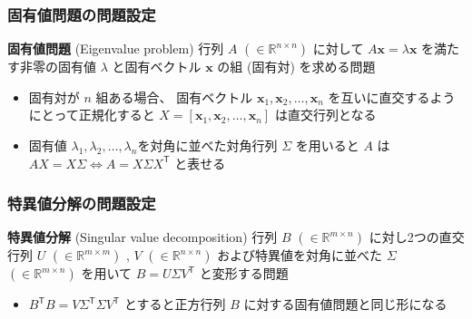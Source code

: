 \documentclass[dvipdfmx,aspectratio=169,20pt]{beamer}
\newcommand{\myfontsetting}[3]{{\fontsize{#1}{#2}\selectfont #3}}
\begin{document}
\begin{frame}
\frametitle{\large 固有値問題の問題設定}

\begin{block}{\myfontsetting{22pt}{22pt}{\bf 固有値問題} {\small (Eigenvalue problem)}}
\myfontsetting{17pt}{17pt}{
    行列 $A$ \myfontsetting{12pt}{12pt}{
    $(\in \mathbb{R}^{n\times n})$
    }
    に対して $A\bm{x} = \lambda \bm{x}$ を満たす非零の固有値 $\lambda$ と固有ベクトル $\bm{x}$ の組 (固有対) を求める問題
}
\end{block}

\vspace{-2mm}

\begin{itemize}
    \item \myfontsetting{15pt}{15pt}{ 
    固有対が $n$ 組ある場合、
    固有ベクトル \myfontsetting{12pt}{12pt}{ $\bm{x}_1,\bm{x}_2,\dots,\bm{x}_n$} を互いに直交するようにとって正規化すると
    \myfontsetting{12pt}{12pt}{ 
    $X=[\bm{x}_1,\bm{x}_2,\dots,\bm{x}_n]$}
    は直交行列となる
    }
    \item \myfontsetting{15pt}{15pt}{ 
    固有値\myfontsetting{12pt}{12pt}{ $\lambda_1, \lambda_2, \dots, \lambda_n$}を対角に並べた対角行列 $\Sigma$ を用いると $A$ は\myfontsetting{12pt}{12pt}{ $AX=X\Sigma \Leftrightarrow A=X\Sigma X^\mathsf{T}$} と表せる
    }
\end{itemize}
\end{frame}
\begin{frame}
\frametitle{\large 特異値分解の問題設定}
\begin{block}{\myfontsetting{22pt}{22pt}{\bf 特異値分解} \myfontsetting{15pt}{15pt}{ (Singular value decomposition)}}
\myfontsetting{17pt}{17pt}{
    行列 $B$ \myfontsetting{12pt}{12pt}{ 
    $(\in \mathbb{R}^{m\times n})$
    }
    に対し2つの直交行列 $U$ \myfontsetting{12pt}{12pt}{
    $(\in \mathbb{R}^{m\times m})$
    }, $V$ \myfontsetting{12pt}{12pt}{
    $(\in \mathbb{R}^{n\times n})$
    } および特異値を対角に並べた $\Sigma$ \myfontsetting{12pt}{12pt}{
    $(\in \mathbb{R}^{m\times n})$
    }を用いて $B=U\Sigma V^\mathsf{T}$ と変形する問題
}
\end{block}

\vspace{-2mm}

\begin{itemize}
    \item \myfontsetting{14pt}{15pt}{ $B^\mathsf{T}B=V\Sigma ^\mathsf{T}\Sigma V^\mathsf{T}$ とすると正方行列 $B$ に対する固有値問題と同じ形になる
    }
\end{itemize}
\end{frame}
\end{document}
